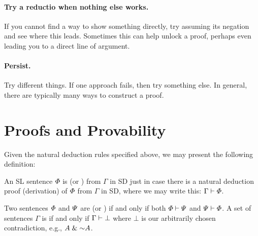 \paragraph{Try a reductio when nothing else works.}
If you cannot find a way to show something directly, try assuming its negation and see where this leads.
Sometimes this can help unlock a proof, perhaps even leading you to a direct line of argument.

\paragraph{Persist.}
Try different things.
If one approach fails, then try something else.
In general, there are typically many ways to construct a proof.




\section{Proofs and Provability}

Given the natural deduction rules specified above, we may present the following definition:


An SL sentence $\varPhi$ is  (or ) from $\Gamma$ in SD just in case there is a natural deduction proof (derivation) of $\varPhi$ from $\Gamma$ in SD, where we may write this: $\Gamma \vdash \varPhi$. 

Two sentences $\varPhi$ and $\varPsi$ are  (or ) if and only if both $\varPhi\vdash\varPsi$ and $\varPsi\vdash\varPhi$.
A set of sentences $\Gamma$ is  if and only if $\Gamma\vdash\bot$ where $\bot$ is our arbitrarily chosen contradiction, e.g., $A\eand\enot A$.


